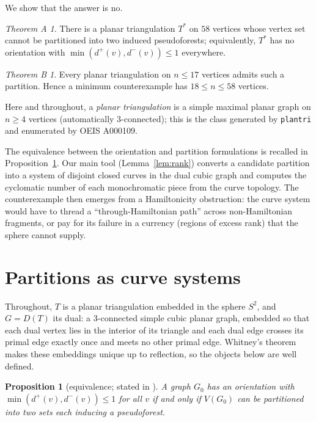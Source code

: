 \documentclass[11pt]{article}
\newtheorem{proposition}[theorem]{Proposition}
\theoremstyle{remark}
\newtheorem*{thmA}{Theorem A}
\newtheorem*{thmB}{Theorem B}
\newcommand{\dout}{d^{+}}
\newcommand{\din}{d^{-}}
\begin{document}
We show that the answer is no.

\begin{thmA}\label{thm:A}
There is a planar triangulation $T^{*}$ on $58$ vertices whose vertex set
cannot be partitioned into two induced pseudoforests; equivalently,
$T^{*}$ has no orientation with $\min(\dout(v),\din(v))\le 1$ everywhere.
\end{thmA}

\begin{thmB}\label{thm:B}
Every planar triangulation on $n\le 17$ vertices admits such a partition.
Hence a minimum counterexample has $18\le n\le 58$ vertices.
\end{thmB}

Here and throughout, a \emph{planar triangulation} is a simple maximal
planar graph on $n\ge 4$ vertices (automatically $3$-connected); this is
the class generated by \texttt{plantri} \cite{plantri} and enumerated by
OEIS A000109.

The equivalence between the orientation and partition formulations is
recalled in Proposition~\ref{prop:equiv}. Our main tool
(Lemma~\ref{lem:rank}) converts a candidate partition into a system of
disjoint closed curves in the dual cubic graph and computes the cyclomatic
number of each monochromatic piece from the curve topology. The
counterexample then emerges from a Hamiltonicity obstruction: the curve
system would have to thread a ``through-Hamiltonian path'' across
non-Hamiltonian fragments, or pay for its failure in a currency (regions
of excess rank) that the sphere cannot supply.

\section{Partitions as curve systems}\label{sec:curves}

Throughout, $T$ is a planar triangulation embedded in the sphere $S^2$,
and $G=D(T)$ its dual: a $3$-connected simple cubic planar graph, embedded
so that each dual vertex lies in the interior of its triangle and each
dual edge crosses its primal edge exactly once and meets no other primal
edge. Whitney's theorem makes these embeddings unique up to reflection, so
the objects below are well defined.

\begin{proposition}[equivalence; stated in \cite{Plo26}]\label{prop:equiv}
A graph $G_0$ has an orientation with $\min(\dout(v),\din(v))\le 1$ for
all $v$ if and only if $V(G_0)$ can be partitioned into two sets each
inducing a pseudoforest.
\end{proposition}
\end{document}
